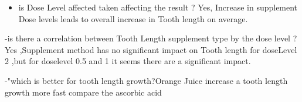 \documentclass[
]{article}
\providecommand{\tightlist}{%
  \setlength{\itemsep}{0pt}\setlength{\parskip}{0pt}}
\begin{document}
\begin{itemize}
\tightlist
\item
  is Dose Level affected taken affecting the result ? Yes, Increase in
  supplement Dose levels leads to overall increase in Tooth length on
  average.
\end{itemize}

-is there a correlation between Tooth Length supplement type by the dose
level ? Yes ,Supplement method has no significant impact on Tooth length
for doseLevel 2 ,but for doselevel 0.5 and 1 it seems there are a
significant impact.

-"which is better for tooth length growth?Orange Juice increase a tooth
length growth more fast compare the ascorbic acid
\end{document}
